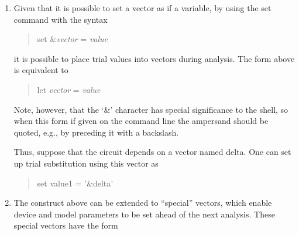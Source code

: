 \begin{enumerate}
{The first line creates a vector named ``{\vt vec}'' of size sufficient
to contain the indices.  The iterated values will be placed in {\vt
vec[5]} and {\vt vec[6]}.  The circuit should reference these values,
either through shell substitution (e.g., {\vt \$\&vec[5]}) or directly
as vectors.

Alternatively, a variable named ``{\vt checkN1}'' can be set.  If the
value of this variable is an integer, that integer will be used as the
index.  If the variable is a name token, then the index will be
supplied by a vector of the given name.  The same applies to {\vt
checkN2}.  The following example illustrates these alternatives:

\begin{quote}
{\vt let vec[10] = 0}\\
{\vt set checkN1 = 5}\\
{\vt let foo = 6}\\
{\vt set checkN2 = foo}
\end{quote}
}

\item{
Given that it is possible to set a vector as if a variable, by using
the {\cb set} command with the syntax

\begin{quote}
{\vt set \&}{\it vector} {\vt =} {\it value}
\end{quote}

it is possible to place trial values into vectors during analysis. 
The form above is equivalent to

\begin{quote}
{\vt let} {\it vector} {\vt =} {\it value}
\end{quote}

Note, however, that the `{\vt \&}' character has special significance
to the {\WRspice} shell, so when this form if given on the command
line the ampersand should be quoted, e.g., by preceding it with a
backslash.

Thus, suppose that the circuit depends on a vector named {\vt delta}. 
One can set up trial substitution using this vector as

\begin{quote}
{\vt set value1 = '\&delta'}
\end{quote}
}

\item{
The construct above can be extended to ``special'' vectors,
which enable device and model parameters to be set ahead of the
next analysis.  These special vectors have the form

}
\end{enumerate}
